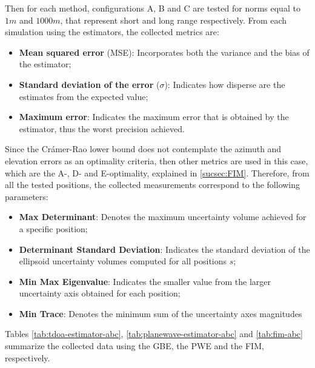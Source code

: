 Then for each method, configurations A, B and C are tested for norms equal to $1m$ and $1000m$, that represent short and long range respectively. From each simulation using the estimators, the collected metrics are:
 
\begin{itemize}
	\item \textbf{Mean squared error} (MSE): Incorporates both the variance and the bias of the estimator;
	
	\item \textbf{Standard deviation of the error} ($\sigma$): Indicates how disperse are the estimates from the expected value;
	
	\item \textbf{Maximum error}: Indicates the maximum error that is obtained by the estimator, thus the worst precision achieved.
\end{itemize} 

Since the Crámer-Rao lower bound does not contemplate the azimuth and elevation errors as an optimality criteria, then other metrics are used in this case, which are the A-, D- and E-optimality, explained in \ref{sucsec:FIM}. Therefore, from all the tested positions, the collected measurements correspond to the following parameters: 

\begin{itemize}
	\item \textbf{Max Determinant}: Denotes the maximum uncertainty volume achieved for a specific position;
	
	\item \textbf{Determinant Standard Deviation}: Indicates the standard deviation of the ellipsoid uncertainty volumes computed for all positions $s$;
	
	\item \textbf{Min Max Eigenvalue}: Indicates the smaller value from the larger uncertainty axis obtained for each position;
	
	\item \textbf{ Min Trace}: Denotes the minimum sum of the uncertainty axes magnitudes
\end{itemize} 

Tables  \ref{tab:tdoa-estimator-abc}, \ref{tab:planewave-estimator-abc} and \ref{tab:fim-abc} summarize the collected data using the GBE, the PWE and the FIM, respectively.

